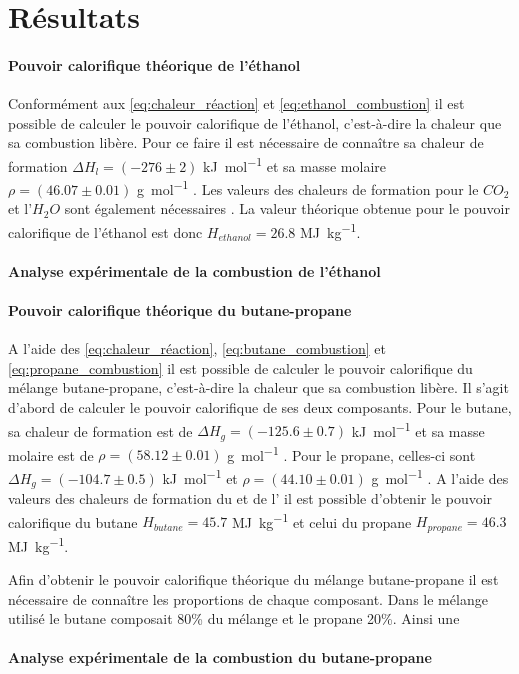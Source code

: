 \section{Résultats}

\paragraph*{Pouvoir calorifique théorique de l'éthanol}
Conformément aux \autoref{eq:chaleur_réaction} et \autoref{eq:ethanol_combustion} il est possible de calculer le pouvoir calorifique de l'éthanol, c'est-à-dire la chaleur que sa combustion libère. Pour ce faire il est nécessaire de connaître sa chaleur de formation \(\Delta H_{l} = (-276 \pm 2)\) \si{\kilo\joule\per\mol} et sa masse molaire \(\rho = (46.07 \pm 0.01)\) \si{\gram\per\mol} \cite{ethanol-values}. Les valeurs des chaleurs de formation pour le \(CO_2\) et l'\(H_2O\) sont également nécessaires \cite{notice}. La valeur théorique obtenue pour le pouvoir calorifique de l'éthanol est donc \(H_{ethanol} = 26.8\) \si{\mega\joule\per\kilo\gram}.


\paragraph*{Analyse expérimentale de la combustion de l'éthanol}





\paragraph*{Pouvoir calorifique théorique du butane-propane}
A l'aide des \autoref{eq:chaleur_réaction}, \autoref{eq:butane_combustion} et \autoref{eq:propane_combustion} il est possible de calculer le pouvoir calorifique du mélange butane-propane, c'est-à-dire la chaleur que sa combustion libère. Il s'agit d'abord de calculer le pouvoir calorifique de ses deux composants. Pour le butane, sa chaleur de formation est de \(\Delta H_{g} = (-125.6 \pm 0.7)\) \si{\kilo\joule\per\mol} et sa masse molaire est de \(\rho = (58.12 \pm 0.01)\) \si{\gram\per\mol} \cite{butane-values}. Pour le propane, celles-ci sont \(\Delta H_{g} = (-104.7 \pm 0.5)\) \si{\kilo\joule\per\mol} et \(\rho = (44.10 \pm 0.01)\) \si{\gram\per\mol} \cite{propane-values}. A l'aide des valeurs des chaleurs de formation du  et de l' \cite{notice} il est possible d'obtenir le pouvoir calorifique du butane \(H_{butane} = 45.7\) \si{\mega\joule\per\kilo\gram} et celui du propane \(H_{propane} = 46.3\) \si{\mega\joule\per\kilo\gram}.

Afin d'obtenir le pouvoir calorifique théorique du mélange butane-propane il est nécessaire de connaître les proportions de chaque composant. Dans le mélange utilisé le butane composait 80\% du mélange et le propane 20\%. Ainsi une






\paragraph*{Analyse expérimentale de la combustion du butane-propane}


